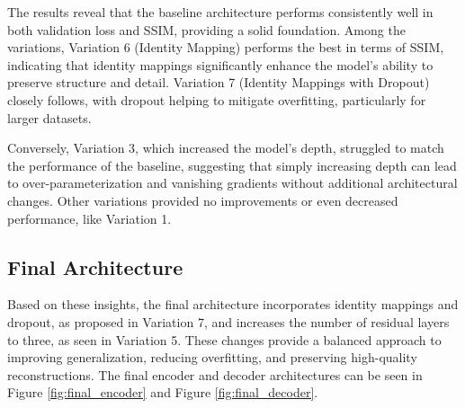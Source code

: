 The results reveal that the baseline architecture performs consistently well in both validation loss and \gls{SSIM}, providing a solid foundation.
Among the variations, Variation 6 (Identity Mapping) performs the best in terms of \gls{SSIM}, indicating that identity mappings significantly enhance the model’s ability to preserve structure and detail.
Variation 7 (Identity Mappings with Dropout) closely follows, with dropout helping to mitigate overfitting, particularly for larger datasets.

Conversely, Variation 3, which increased the model’s depth, struggled to match the performance of the baseline, suggesting that simply increasing depth can lead to over-parameterization and vanishing gradients without additional architectural changes.
Other variations provided no improvements or even decreased performance, like Variation 1. 

\subsection{Final Architecture}
Based on these insights, the final architecture incorporates identity mappings and dropout, as proposed in Variation 7, and increases the number of residual layers to three, as seen in Variation 5.
These changes provide a balanced approach to improving generalization, reducing overfitting, and preserving high-quality reconstructions.
The final encoder and decoder architectures can be seen in Figure \ref{fig:final_encoder} and Figure \ref{fig:final_decoder}.

